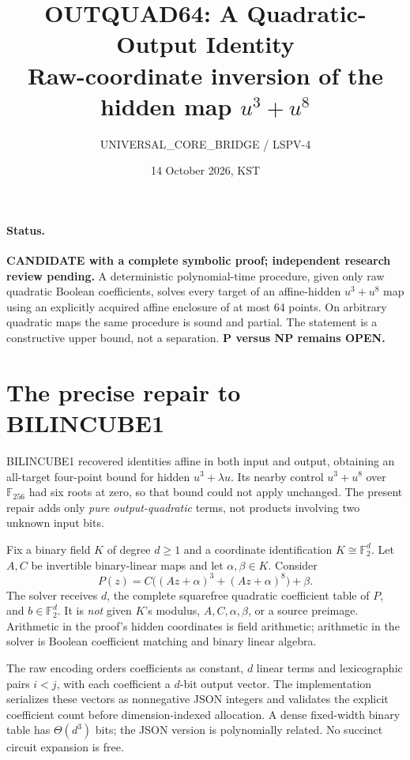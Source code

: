 \documentclass[11pt]{article}
\title{OUTQUAD64: A Quadratic-Output Identity\\
\large Raw-coordinate inversion of the hidden map $u^3+u^8$}
\author{UNIVERSAL\_CORE\_BRIDGE / LSPV-4}
\date{14 October 2026, KST}
\newcommand{\F}{\mathbb F_2}
\begin{document}
\maketitle
\paragraph{Status.}
\textbf{CANDIDATE with a complete symbolic proof; independent research review pending.}
A deterministic polynomial-time procedure, given only raw quadratic Boolean
coefficients, solves every target of an affine-hidden $u^3+u^8$ map using an
explicitly acquired affine enclosure of at most 64 points. On arbitrary
quadratic maps the same procedure is sound and partial. The statement is a
constructive upper bound, not a separation. \textbf{P versus NP remains OPEN.}

\section{The precise repair to BILINCUBE1}
BILINCUBE1 recovered identities affine in both input and output, obtaining an
all-target four-point bound for hidden $u^3+\lambda u$. Its nearby control
$u^3+u^8$ over $\mathbb F_{256}$ had six roots at zero, so that bound could not
apply unchanged. The present repair adds only \emph{pure output-quadratic}
terms, not products involving two unknown input bits.

Fix a binary field $K$ of degree $d\ge1$ and a coordinate identification
$K\cong\F^d$. Let $A,C$ be invertible binary-linear maps and let
$\alpha,\beta\in K$. Consider
\[
 P(z)=C\big((Az+\alpha)^3+(Az+\alpha)^8\big)+\beta.       \tag{1}
\]
The solver receives $d$, the complete squarefree quadratic coefficient table
of $P$, and $b\in\F^d$. It is \emph{not} given $K$'s modulus, $A,C,\alpha,\beta$,
or a source preimage. Arithmetic in the proof's hidden coordinates is field
arithmetic; arithmetic in the solver is Boolean coefficient matching and
binary linear algebra.

The raw encoding orders coefficients as constant, $d$ linear terms and
lexicographic pairs $i<j$, with each coefficient a $d$-bit output vector.
The implementation serializes these vectors as nonnegative JSON integers and
validates the explicit coefficient count before dimension-indexed allocation.
A dense fixed-width binary table has $\Theta(d^3)$ bits; the JSON version is
polynomially related. No succinct circuit expansion is free.
\end{document}
